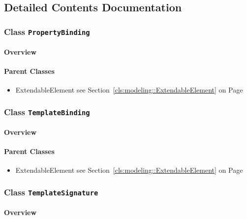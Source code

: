 			
		



\subsection{Detailed Contents Documentation}
\subsubsection{\Large{Class \bfseries \texttt{PropertyBinding}\normalfont}}
\label{cls:modeling::templates::PropertyBinding} 
\paragraph{Overview}

	



\paragraph{Parent Classes}
\begin{itemize}
\item ExtendableElement see Section~\ref{cls:modeling::ExtendableElement} on Page~\pageref{cls:modeling::ExtendableElement}\end{itemize}
\subsubsection{\Large{Class \bfseries \texttt{TemplateBinding}\normalfont}}
\label{cls:modeling::templates::TemplateBinding} 
\paragraph{Overview}

	



\paragraph{Parent Classes}
\begin{itemize}
\item ExtendableElement see Section~\ref{cls:modeling::ExtendableElement} on Page~\pageref{cls:modeling::ExtendableElement}\end{itemize}
\subsubsection{\Large{Class \bfseries \texttt{TemplateSignature}\normalfont}}
\label{cls:modeling::templates::TemplateSignature} 
\paragraph{Overview}

	



\newpage
		




